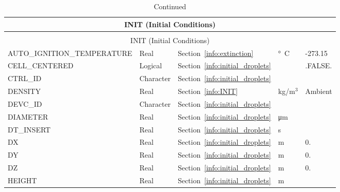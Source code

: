 \documentclass[11pt]{book}
\begin{document}
\begin{longtable}{@{\extracolsep{\fill}}|l|l|l|l|l|}
\caption[Initial conditions ({\ct INIT} namelist group)]{For more information see Section~\ref{info:INIT}.}
\label{tbl:INIT} \\
\hline
\multicolumn{5}{|c|}{{\ct INIT} (Initial Conditions)} \\
\hline \hline
\endfirsthead
\caption[]{Continued} \\
\hline
\multicolumn{5}{|c|}{{\ct INIT} (Initial Conditions)} \\
\hline \hline
\endhead
{\ct AUTO\_IGNITION\_TEMPERATURE} & Real              & Section~\ref{info:extinction}                 & \si{\degree C} & {-273.15}     \\ \hline
{\ct CELL\_CENTERED}              & Logical           & Section~\ref{info:initial_droplets}           &                & {\ct .FALSE.} \\ \hline
{\ct CTRL\_ID}                    & Character         & Section~\ref{info:initial_droplets}           &                &               \\ \hline
{\ct DENSITY}                     & Real              & Section~\ref{info:INIT}                       & kg/m$^3$       & Ambient       \\ \hline
{\ct DEVC\_ID}                    & Character         & Section~\ref{info:initial_droplets}           &                &               \\ \hline
{\ct DIAMETER}                    & Real              & Section~\ref{info:initial_droplets}           & \si{\micro m}  &               \\ \hline
{\ct DT\_INSERT}                  & Real              & Section~\ref{info:initial_droplets}           & s              &               \\ \hline
{\ct DX}                          & Real              & Section~\ref{info:initial_droplets}           & m              & 0.            \\ \hline
{\ct DY}                          & Real              & Section~\ref{info:initial_droplets}           & m              & 0.            \\ \hline
{\ct DZ}                          & Real              & Section~\ref{info:initial_droplets}           & m              & 0.            \\ \hline
{\ct HEIGHT}                      & Real              & Section~\ref{info:initial_droplets}           & m              &               \\ \hline

\end{longtable}
\end{document}
